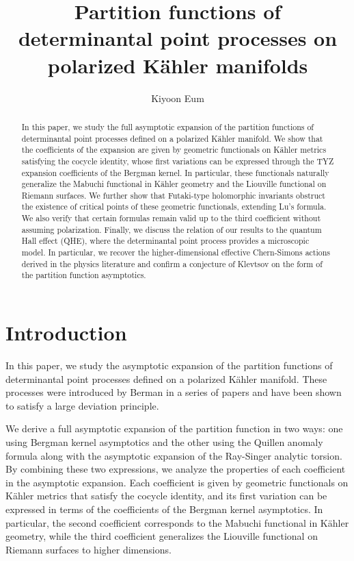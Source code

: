 \documentclass[12pt,reqno,a4paper]{amsart}
\title[Partition functions of DPP on polarized K\"ahler manifolds]{Partition functions of determinantal point processes on polarized K\"ahler manifolds}
\author{Kiyoon Eum}
\numberwithin{equation}{section}
\newcommand{\kahler}{K\"ahler }
\theoremstyle{remark}
\theoremstyle{dotless}
\begin{document}
\begin{abstract}
In this paper, we study the full asymptotic expansion of the partition functions of determinantal point processes defined on a polarized \kahler manifold. We show that the coefficients of the expansion are given by geometric functionals on \kahler metrics satisfying the cocycle identity, whose first variations can be expressed through the TYZ expansion coefficients of the Bergman kernel. In particular, these functionals naturally generalize the Mabuchi functional in \kahler geometry and the Liouville functional on Riemann surfaces. We further show that Futaki-type holomorphic invariants obstruct the existence of critical points of these geometric functionals, extending Lu's formula. We also verify that certain formulas remain valid up to the third coefficient without assuming polarization. Finally, we discuss the relation of our results to the quantum Hall effect (QHE), where the determinantal point process provides a microscopic model. In particular, we recover the higher-dimensional effective Chern-Simons actions derived in the physics literature and confirm a conjecture of Klevtsov on the form of the partition function asymptotics.
\end{abstract}

\maketitle

\thispagestyle{empty}
\tableofcontents


\section{Introduction}

In this paper, we study the asymptotic expansion of the partition functions of determinantal point processes defined on a polarized K\"ahler manifold. These processes were introduced by Berman in a series of papers \cite{berman2013determinantal,berman2014determinantal,berman2017large} and have been shown to satisfy a large deviation principle.

We derive a full asymptotic expansion of the partition function in two ways: one using Bergman kernel asymptotics and the other using the Quillen anomaly formula along with the asymptotic expansion of the Ray-Singer analytic torsion. By combining these two expressions, we analyze the properties of each coefficient in the asymptotic expansion. Each coefficient is given by geometric functionals on K\"ahler metrics that satisfy the cocycle identity, and its first variation can be expressed in terms of the coefficients of the Bergman kernel asymptotics. In particular, the second coefficient corresponds to the Mabuchi functional in K\"ahler geometry, while the third coefficient generalizes the Liouville functional on Riemann surfaces to higher dimensions.
\end{document}
